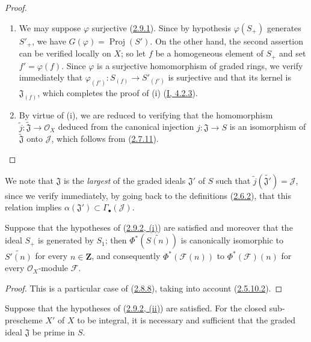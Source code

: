 \begin{proof}
\begin{enumerate}
  \item[\rm(i)] We may suppose $\varphi$ surjective
    (\hyperref[II.2.9.1]{2.9.1}). Since by hypothesis
    $\varphi(S_+)$ generates $S'_+$, we have
    $G(\varphi)=\operatorname{Proj}(S')$. On the other hand, the second
    assertion can be verified locally on $X$; so let $f$ be a homogeneous
    element of $S_+$ and set $f'=\varphi(f)$. Since $\varphi$ is a surjective
    homomorphism of graded rings, we verify immediately that
    $\varphi_{(f')}:S_{(f)}\to S'_{(f')}$ is surjective and that its kernel is
    $\mathfrak{J}_{(f)}$, which completes the proof of (i)
    (\hyperref[I.4.2.3]{I, 4.2.3}).
  \item[\rm(ii)] By virtue of (i), we are reduced to verifying that the
    homomorphism $\widetilde{j}:\widetilde{\mathfrak{J}}\to\mathcal{O}_X$
    deduced from the canonical injection $j:\mathfrak{J}\to S$ is an
    isomorphism of $\widetilde{\mathfrak{J}}$ onto $\mathcal{J}$, which
    follows from (\hyperref[II.2.7.11]{2.7.11}).
\end{enumerate}
\end{proof}

We note that $\mathfrak{J}$ is the \emph{largest} of the graded ideals
$\mathfrak{J}'$ of $S$ such that
$\widetilde{j}(\widetilde{\mathfrak{J}'})=\mathcal{J}$, since we verify
immediately, by going back to the definitions
(\hyperref[II.2.6.2]{2.6.2}), that this relation implies
$\alpha(\mathfrak{J}')\subset\Gamma_\bullet(\mathcal{J})$.

\begin{corollary}[2.9.3]
\label{II.2.9.3}
Suppose that the hypotheses of
(\hyperref[II.2.9.2]{2.9.2, (i)}) are satisfied and moreover that the ideal
$S_+$ is generated by $S_1$; then $\Phi^*(\widetilde{S(n)})$ is canonically
isomorphic to $\widetilde{S'(n)}$ for every $n\in\mathbf{Z}$, and consequently
$\Phi^*(\mathcal{F}(n))$ to $\Phi^*(\mathcal{F})(n)$ for every
$\mathcal{O}_X$-module $\mathcal{F}$.
\end{corollary}

\begin{proof}
This is a particular case of (\hyperref[II.2.8.8]{2.8.8}), taking into
account (\hyperref[II.2.5.10.2]{2.5.10.2}).
\end{proof}

\begin{corollary}[2.9.4]
\label{II.2.9.4}
Suppose that the hypotheses of
(\hyperref[II.2.9.2]{2.9.2, (ii)}) are satisfied. For the closed
sub-prescheme $X'$ of $X$ to be integral, it is necessary and sufficient that
the graded ideal $\mathfrak{J}$ be prime in $S$.
\end{corollary}

